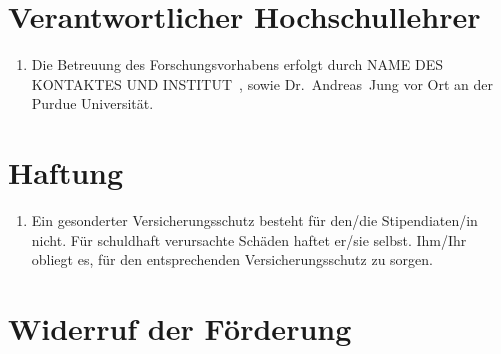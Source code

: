 \documentclass[
  paper=a4,
  fontsize=12pt,
  DIV=16,
  parskip=full,
  headinclude=true,
]{scrartcl}
\newcommand\stipbetreuung{NAME DES KONTAKTES UND INSTITUT}  %
\begin{document}
\section{Verantwortlicher Hochschullehrer}

\begin{enumerate}[\qquad(1)]
  \item Die Betreuung des Forschungsvorhabens erfolgt durch \stipbetreuung\ ,
  sowie Dr.~Andreas~Jung vor Ort an der Purdue Universität.
\end{enumerate}

\section{Haftung}

\begin{enumerate}[\qquad(1)]
  \item Ein gesonderter Versicherungsschutz besteht für den/die
    Stipendiaten/in nicht.
    Für schuldhaft verursachte Schäden haftet er/sie selbst.
    Ihm/Ihr obliegt es, für den entsprechenden Versicherungsschutz
    zu sorgen.
\end{enumerate}

\section{Widerruf der Förderung}
\end{document}
